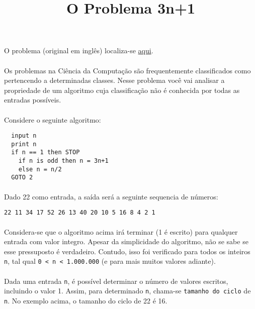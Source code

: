 \documentclass{article}
\title{O Problema 3n+1}
\date{}
\begin{document}
\maketitle
\begin{center}
O problema (original em inglês) localiza-se \href{https://onlinejudge.org/external/1/100.pdf}{aqui}.
\end{center}

\paragraph{}
Os problemas na Ciência da Computação são frequentemente classificados como pertencendo a determinadas classes.
Nesse problema você vai analisar a propriedade de um algoritmo cuja classificação não é conhecida por todas
as entradas possíveis.
\paragraph{}
Considere o seguinte algoritmo:
\begin{lstlisting}
  input n
  print n
  if n == 1 then STOP
    if n is odd then n = 3n+1
    else n = n/2
  GOTO 2
\end{lstlisting}

\paragraph{}
Dado 22 como entrada, a saída será a seguinte sequencia de números:
\begin{center}
\begin{BVerbatim}
22 11 34 17 52 26 13 40 20 10 5 16 8 4 2 1
\end{BVerbatim}
\end{center}

\paragraph{}
Considera-se que o algoritmo acima irá terminar (1 é escrito) para qualquer entrada com valor integro. Apesar da
simplicidade do algoritmo, não se sabe se esse pressuposto é verdadeiro. Contudo, isso foi verificado para todos
os inteiros \verb|n|, tal qual \verb|0 < n < 1.000.000| (e para mais muitos valores adiante).
\paragraph{}
Dada uma entrada \verb|n|, é possível determinar o número de valores escritos, incluindo o valor 1. Assim, para
determinado \verb|n|, chama-se \verb|tamanho do ciclo| de \verb|n|. No exemplo acima, o tamanho do ciclo de 22 é 16.
\end{document}
